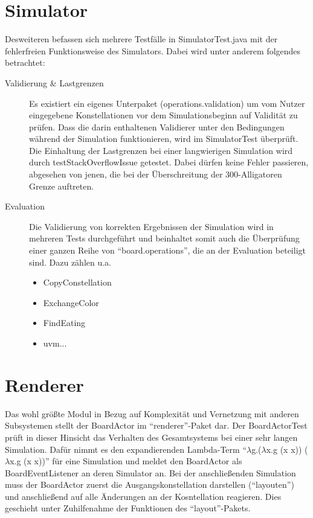 \section{Simulator}
Desweiteren befassen sich mehrere Testfälle in SimulatorTest.java mit der fehlerfreien Funktionsweise des Simulators.
Dabei wird unter anderem folgendes betrachtet:
\begin{description}
	\item[Validierung \& Lastgrenzen] Es existiert ein eigenes Unterpaket (operations.validation) um vom Nutzer eingegebene Konstellationen vor dem Simulationsbeginn auf Validität zu prüfen.
		Dass die darin enthaltenen Validierer unter den Bedingungen während der Simulation funktionieren, wird im SimulatorTest überprüft.
		Die Einhaltung der Lastgrenzen bei einer langwierigen Simulation wird durch testStackOverflowIssue getestet.
		Dabei dürfen keine Fehler passieren, abgesehen von jenen, die bei der Überschreitung der 300-Alligatoren Grenze auftreten.
	\item[Evaluation] Die Validierung von korrekten Ergebnissen der Simulation wird in mehreren Tests durchgeführt und beinhaltet somit auch die Überprüfung einer ganzen Reihe von "`board.operations"', die an der Evaluation beteiligt sind.
		Dazu zählen u.a.
		\begin{itemize}
			\item CopyConstellation
			\item ExchangeColor
			\item FindEating
			\item uvm...
		\end{itemize}
\end{description}


\section{Renderer}
Das wohl größte Modul in Bezug auf Komplexität und Vernetzung mit anderen Subsystemen stellt der BoardActor im "`renderer"'-Paket dar.
Der BoardActorTest prüft in dieser Hinsicht das Verhalten des Gesamtsystems bei einer sehr langen Simulation.
Dafür nimmt es den expandierenden Lambda-Term "`$\lambda$g.($\lambda$x.g (x x)) ($\lambda$x.g (x x))"' für eine Simulation und meldet den BoardActor als BoardEventListener an deren Simulator an.
Bei der anschließenden Simulation muss der BoardActor zuerst die Ausgangskonstellation darstellen ("`layouten"') und anschließend auf alle Änderungen an der Kosntellation reagieren.
Dies geschieht unter Zuhilfenahme der Funktionen des "`layout"'-Pakets.
